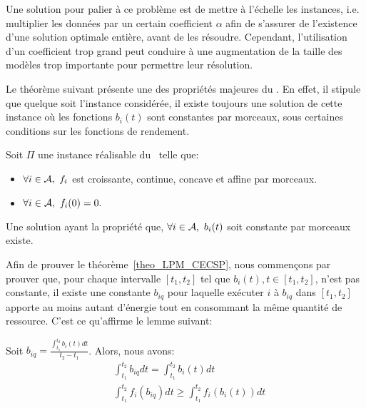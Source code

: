 Une solution pour palier à ce problème est de mettre à l'échelle les
instances, i.e. multiplier les données par un certain coefficient $\alpha$
afin de s'assurer de l'existence d'une solution optimale entière,
avant de les résoudre. Cependant, l'utilisation d'un coefficient trop
grand peut conduire à une augmentation de la taille des modèles trop
importante pour permettre leur résolution. 


Le théorème suivant présente une des propriétés majeures du \CECSP. En
effet, il stipule que quelque soit l'instance considérée, il existe
toujours une solution de cette instance où les fonctions $b_i(t)$ sont
constantes par morceaux, sous certaines conditions sur les fonctions de
rendement.  

\begin{theo}
\label{theo_LPM_CECSP}
Soit $\Pi$ une instance réalisable du \CECSP~telle que:
\begin{itemize}
\item $\forall i \in {\cal A},\ f_i$ est croissante, continue, concave et
  affine par morceaux. 
\item $\forall i \in \A,\ f_i(0)=0.$
\end{itemize}
Une solution ayant la propriété que, $\forall i \in {\cal A},\ b_i(t)$ soit
constante par morceaux existe.
\end{theo}

Afin de prouver le théorème~\ref{theo_LPM_CECSP}, nous commençons par
prouver que, pour chaque intervalle $[t_1,t_2]$ tel que $b_i(t), t \in
[t_1,t_2]$, n'est pas constante, il existe une constante $b_{iq}$ pour
laquelle exécuter $i$ à $b_{iq}$ dans $[t_1,t_2]$ apporte au moins
autant d'énergie tout en consommant la même quantité de
ressource. C'est ce qu'affirme le lemme suivant:

\begin{lemma}
\label{lemmaEn}
Soit $b_{iq}= \frac{\int_{t_1}^{t_2}b_i(t)dt}{t_2-t_1}$. Alors, nous
avons:
\begin{align}
  &\int_{t_1}^{t_2}b_{iq}dt = \int_{t_1}^{t_2} b_i(t) dt \label{eq_LPM_res} \\
  & \int_{t_1}^{t_2}f_i(b_{iq})dt \ge \int_{t_1}^{t_2} f_i(b_i(t)) dt 
    \label{eq_LPM_nrj}
\end{align}
\end{lemma}

